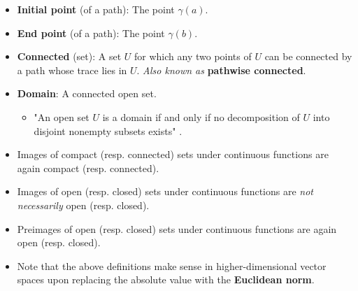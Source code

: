 \documentclass[../notes.tex]{subfiles}
\begin{document}
\begin{itemize}
    \item \textbf{Initial point} (of a path): The point $\gamma(a)$.
    \item \textbf{End point} (of a path): The point $\gamma(b)$.
    \item \textbf{Connected} (set): A set $U$ for which any two points of $U$ can be connected by a path whose trace lies in $U$. \emph{Also known as} \textbf{pathwise connected}.
    \item \textbf{Domain}: A connected open set.
    \begin{itemize}
        \item "An open set $U$ is a domain if and only if no decomposition of $U$ into disjoint nonempty subsets exists" \parencite[3]{bib:FischerLieb}.
    \end{itemize}
    \item Images of compact (resp. connected) sets under continuous functions are again compact (resp. connected).
    \item Images of open (resp. closed) sets under continuous functions are \emph{not necessarily} open (resp. closed).
    \item Preimages of open (resp. closed) sets under continuous functions are again open (resp. closed).
    \item Note that the above definitions make sense in higher-dimensional vector spaces upon replacing the absolute value with the \textbf{Euclidean norm}.
\end{itemize}
\end{document}
